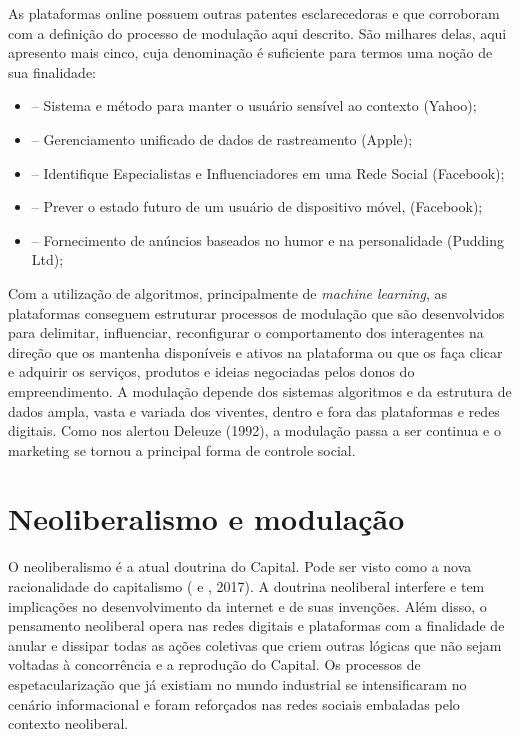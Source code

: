 As plataformas online possuem outras patentes esclarecedoras e que
corroboram com a definição do processo de modulação aqui descrito. São
milhares delas, aqui apresento mais cinco, cuja denominação é suficiente
para termos uma noção de sua finalidade:

\begin{itemize}
\item
   -- Sistema e método para manter o usuário sensível ao
  contexto (Yahoo);
\item
   -- Gerenciamento unificado de dados de rastreamento
  (Apple);
\item
   -- Identifique Especialistas e Influenciadores em uma
  Rede Social (Facebook);
\item
   -- Prever o estado futuro de um usuário de dispositivo
  móvel, (Facebook);
\item
   -- Fornecimento de anúncios baseados no humor e na
  personalidade (Pudding Ltd);
\end{itemize}

Com a utilização de algoritmos, principalmente de \emph{machine
learning}, as plataformas conseguem estruturar processos de modulação
que são desenvolvidos para delimitar, influenciar, reconfigurar o
comportamento dos interagentes na direção que os mantenha disponíveis e
ativos na plataforma ou que os faça clicar e adquirir os serviços,
produtos e ideias negociadas pelos donos do empreendimento. A modulação
depende dos sistemas algoritmos e da estrutura de dados ampla, vasta e
variada dos viventes, dentro e fora das plataformas e redes digitais.
Como nos alertou Deleuze (1992), a modulação passa a ser continua e o
marketing se tornou a principal forma de controle social.

\section{Neoliberalismo e modulação}

O neoliberalismo é a atual doutrina do Capital. Pode ser visto como a
nova racionalidade do capitalismo ( e , 2017). A doutrina
neoliberal interfere e tem implicações no desenvolvimento da internet e
de suas invenções. Além disso, o pensamento neoliberal opera nas redes
digitais e plataformas com a finalidade de anular e dissipar todas as
ações coletivas que criem outras lógicas que não sejam voltadas à
concorrência e a reprodução do Capital. Os processos de
espetacularização que já existiam no mundo industrial se intensificaram
no cenário informacional e foram reforçados nas redes sociais embaladas
pelo contexto neoliberal.

